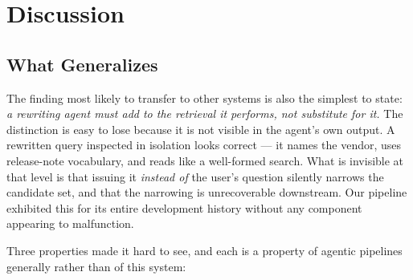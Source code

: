 
\section{Discussion}\label{sec:discussion}

\subsection{What Generalizes}\label{sec:generalizes}

The finding most likely to transfer to other systems is also the simplest to
state: \emph{a rewriting agent must add to the retrieval it performs, not
substitute for it.} The distinction is easy to lose because it is not visible
in the agent's own output. A rewritten query inspected in isolation looks
correct --- it names the vendor, uses release-note vocabulary, and reads like a
well-formed search. What is invisible at that level is that issuing it
\emph{instead of} the user's question silently narrows the candidate set, and
that the narrowing is unrecoverable downstream. Our pipeline exhibited this for
its entire development history without any component appearing to malfunction.

Three properties made it hard to see, and each is a property of agentic
pipelines generally rather than of this system:

